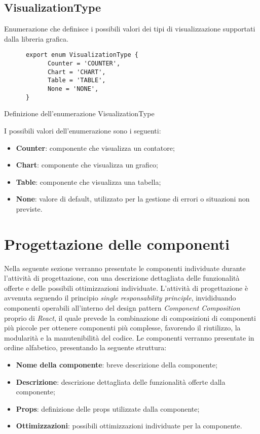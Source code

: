 \subsection{VisualizationType}
Enumerazione che definisce i possibili valori dei tipi di visualizzazione supportati dalla libreria grafica.
\begin{listing}[H]
      \begin{verbatim}
      export enum VisualizationType {
            Counter = 'COUNTER',
            Chart = 'CHART',
            Table = 'TABLE',
            None = 'NONE',
      }
      \end{verbatim}
      \caption{Definizione dell'enumerazione VisualizationType}
      \label{listing:visualizationType}
\end{listing}
I possibili valori dell'enumerazione sono i seguenti:
\begin{itemize}
      \item \textbf{Counter}: componente che visualizza un contatore;
      \item \textbf{Chart}: componente che visualizza un grafico;
      \item \textbf{Table}: componente che visualizza una tabella;
      \item \textbf{None}: valore di default, utilizzato per la gestione di errori o situazioni non previste.
\end{itemize}

\section{Progettazione delle componenti}
Nella seguente sezione verranno presentate le componenti individuate durante l'attività di progettazione, con una descrizione dettagliata delle
funzionalità offerte e delle possibili ottimizzazioni individuate. \newline
L'attività di progettazione è avvenuta seguendo il principio \textit{single responsability principle}, invididuando componenti operabili all'interno
del design pattern \textit{Component Composition} proprio di \textit{React}, il quale prevede la combinazione di composizioni di componenti più piccole
per ottenere componenti più complesse, favorendo il riutilizzo, la modularità e la manutenibilità del codice. \newline
Le componenti verranno presentate in ordine alfabetico, presentando la seguente struttura:
\begin{itemize}
      \item \textbf{Nome della componente}: breve descrizione della componente;
      \item \textbf{Descrizione}: descrizione dettagliata delle funzionalità offerte dalla componente;
      \item \textbf{Props}: definizione delle props utilizzate dalla componente;
      \item \textbf{Ottimizzazioni}: possibili ottimizzazioni individuate per la componente.
\end{itemize}

